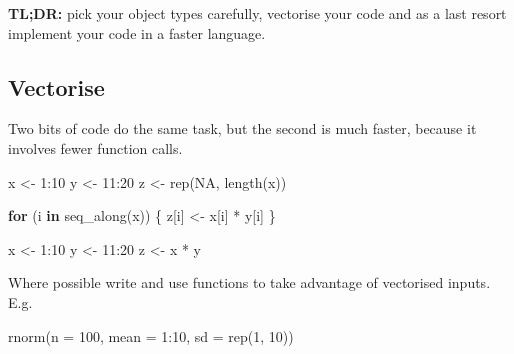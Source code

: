 \documentclass[
  12pt,
]{book}
\newenvironment{Shaded}{\begin{snugshade}}{\end{snugshade}}
\newcommand{\AttributeTok}[1]{\textcolor[rgb]{0.77,0.63,0.00}{#1}}
\newcommand{\ConstantTok}[1]{\textcolor[rgb]{0.00,0.00,0.00}{#1}}
\newcommand{\ControlFlowTok}[1]{\textcolor[rgb]{0.13,0.29,0.53}{\textbf{#1}}}
\newcommand{\DecValTok}[1]{\textcolor[rgb]{0.00,0.00,0.81}{#1}}
\newcommand{\FunctionTok}[1]{\textcolor[rgb]{0.00,0.00,0.00}{#1}}
\newcommand{\NormalTok}[1]{#1}
\newcommand{\OtherTok}[1]{\textcolor[rgb]{0.56,0.35,0.01}{#1}}
\newcommand{\SpecialCharTok}[1]{\textcolor[rgb]{0.00,0.00,0.00}{#1}}
\begin{document}
\textbf{TL;DR:} pick your object types carefully, vectorise your code and as a last resort implement your code in a faster language.

\hypertarget{vectorise}{%
\subsection{Vectorise}\label{vectorise}}

Two bits of code do the same task, but the second is much faster, because it involves fewer function calls.

\begin{Shaded}
\begin{Highlighting}[]
\NormalTok{x }\OtherTok{\textless{}{-}} \DecValTok{1}\SpecialCharTok{:}\DecValTok{10}
\NormalTok{y }\OtherTok{\textless{}{-}} \DecValTok{11}\SpecialCharTok{:}\DecValTok{20} 
\NormalTok{z }\OtherTok{\textless{}{-}} \FunctionTok{rep}\NormalTok{(}\ConstantTok{NA}\NormalTok{, }\FunctionTok{length}\NormalTok{(x))}

\ControlFlowTok{for}\NormalTok{ (i }\ControlFlowTok{in} \FunctionTok{seq\_along}\NormalTok{(x)) \{}
\NormalTok{  z[i] }\OtherTok{\textless{}{-}}\NormalTok{ x[i] }\SpecialCharTok{*}\NormalTok{ y[i]}
\NormalTok{\}}
\end{Highlighting}
\end{Shaded}

\begin{Shaded}
\begin{Highlighting}[]
\NormalTok{x }\OtherTok{\textless{}{-}} \DecValTok{1}\SpecialCharTok{:}\DecValTok{10}
\NormalTok{y }\OtherTok{\textless{}{-}} \DecValTok{11}\SpecialCharTok{:}\DecValTok{20} 
\NormalTok{z }\OtherTok{\textless{}{-}}\NormalTok{ x }\SpecialCharTok{*}\NormalTok{ y}
\end{Highlighting}
\end{Shaded}

Where possible write and use functions to take advantage of vectorised inputs. E.g.

\begin{Shaded}
\begin{Highlighting}[]
\FunctionTok{rnorm}\NormalTok{(}\AttributeTok{n =} \DecValTok{100}\NormalTok{, }\AttributeTok{mean =} \DecValTok{1}\SpecialCharTok{:}\DecValTok{10}\NormalTok{, }\AttributeTok{sd =} \FunctionTok{rep}\NormalTok{(}\DecValTok{1}\NormalTok{, }\DecValTok{10}\NormalTok{))}
\end{Highlighting}
\end{Shaded}
\end{document}
